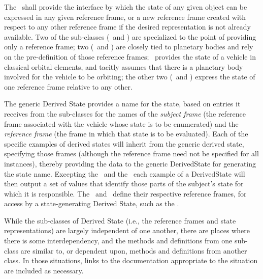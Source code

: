 %
%
% 
%


The \DerivedStateDesc\ shall provide the interface by which the state of any given object can be expressed in any given reference frame, or a new reference frame created with respect to any other reference frame if the desired representation is not already available.  Two of the sub-classes (\LVLHDesc\ and \NEDDesc) are specialized to the point of providing only a reference frame; two (\PlanetaryDesc\ and \SolarBetaDesc) are closely tied to planetary bodies and rely on the pre-definition of those reference frames; \OrbElemDesc\ provides the state of a vehicle in classical orbital elements, and tacitly assumes that there is a planetary body involved for the vehicle to be orbiting; the other two (\EulerDesc\ and \RelativeDesc) express the state of one reference frame relative to any other.

The generic Derived State provides a name for the state, based on entries it receives from the sub-classes for the names of the \textit{subject frame} (the reference frame associated with the vehicle whose state is to be enumerated) and the \textit{reference frame} (the frame in which that state is to be evaluated).  Each of the specific examples of derived states will inherit from the generic derived state, specifying those frames (although the reference frame need not be specified for all instances), thereby providing the data to the generic DerivedState for generating the state name.  Excepting the \LVLHDesc\ and the \NEDDesc\, each example of a DerivedState will then output a set of values that identify those parts of the subject's state for which it is responsible.  The \LVLHDesc\ and \NEDDesc\ define their respective reference frames, for access by a state-generating Derived State, such as the \RelativeDesc.

While the sub-classes of Derived State (i.e., the reference frames and state representations) are largely independent of one another, there are places where there is some interdependency, and the methods and definitions from one sub-class are similar to, or dependent upon, methods and definitions from another class.  In those situations, links to the documentation appropriate to the situation are included as necessary.